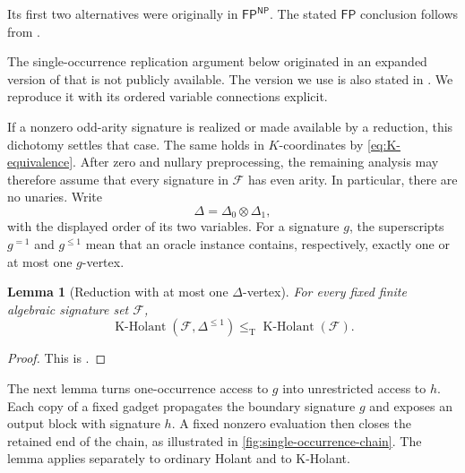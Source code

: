 \documentclass[11pt,letterpaper,onecolumn]{article}
\theoremstyle{plain}
\newtheorem{lemma}[lemma]{Lemma}
\theoremstyle{definition}
\theoremstyle{remark}
\newcommand{\cF}{\mathcal F}
\newcommand{\KHolant}{\operatorname{K\text{-}Holant}}
\newcommand{\FP}{\mathsf{FP}}
\newcommand{\DeltaZero}{\Delta_0}
\newcommand{\DeltaOne}{\Delta_1}
\newcommand{\leT}{\leq_{\mathrm T}}
\begin{document}
	Its first two alternatives were originally in \(\FP^{\mathsf{NP}}\). The
	stated \(\FP\) conclusion follows from
	\cite[Theorem~1.1 and Corollary~1.2]{GuanShaoShi2026}.
	
	
	
The single-occurrence replication argument below originated in an
expanded version of \cite{MengWangXiaZheng2025} that is not publicly
available.  The version we use is also stated in
\cite[Lemma~3.3]{Liu2026DEQ2Holant}. We reproduce it with its ordered
variable connections explicit.

If a nonzero odd-arity signature is realized or made available by a
reduction, this dichotomy settles that case.  The same holds in
\(K\)-coordinates by \cref{eq:K-equivalence}.  After zero and nullary
preprocessing, the remaining analysis may therefore assume that every
signature in \(\cF\) has even arity.  In particular, there are no unaries.
	Write
	\[
	\Delta=\DeltaZero\otimes\DeltaOne,
	\]
	with the displayed order of its two variables.  For a signature \(g\), the
	superscripts \(g^{=1}\) and \(g^{\leq1}\) mean that an oracle instance contains,
	respectively, exactly one or at most one \(g\)-vertex.
	
	\begin{lemma}[Reduction with at most one \(\Delta\)-vertex]
		\label{lem:universal-directed-pair}
		For every fixed finite algebraic signature set \(\cF\),
		\[
		\KHolant(\cF,\Delta^{\leq1})
		\leT
		\KHolant(\cF).
		\]
	\end{lemma}
	
	\begin{proof}
		This is \cite[Lemma~3.2]{Liu2026DEQ2Holant}.
	\end{proof}
	
The next lemma turns one-occurrence access to \(g\) into unrestricted
access to \(h\).  Each copy of a fixed gadget propagates the boundary
signature \(g\) and exposes an output block with signature \(h\).
A fixed nonzero evaluation then closes
the retained end of the chain, as illustrated in
\cref{fig:single-occurrence-chain}.
The lemma applies separately to ordinary Holant and to K-Holant.
\end{document}
